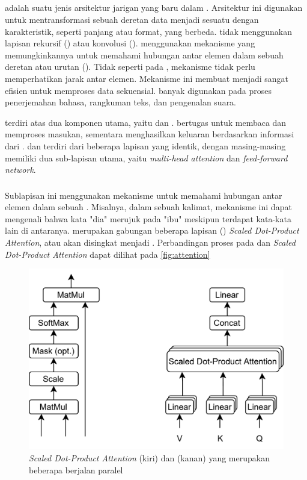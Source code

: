 \subsection{\transformer}
\label{subsec:transformer}

\transformer{} adalah suatu jenis arsitektur jarigan yang baru dalam \dl. Arsitektur ini digunakan untuk mentransformasi sebuah deretan data menjadi sesuatu dengan karakteristik, seperti panjang atau format, yang berbeda. \transformer{} tidak menggunakan lapisan rekursif (\rnn) atau konvolusi (\cnn). \transformer{} menggunakan mekanisme \selfattention{} yang memungkinkannya untuk memahami hubungan antar elemen dalam sebuah deretan atau urutan (\sequence). Tidak seperti pada \rnn{}, mekanisme \selfattention{} tidak perlu memperhatikan jarak antar elemen. Mekanisme ini membuat \transformer{} menjadi sangat efisien untuk memproses data sekuensial. \transformer{} banyak digunakan pada proses penerjemahan bahasa, rangkuman teks, dan pengenalan suara.

\transformer{} terdiri atas dua komponen utama, yaitu \encoder{} dan \decoder. \encoderfl{} bertugas untuk membaca dan memproses \sequence{} masukan, sementara \decoder{} menghasilkan \sequence{} keluaran berdasarkan informasi dari \encoder. \encoderfl{} dan \decoder{} terdiri dari beberapa lapisan yang identik, dengan masing-masing memiliki dua sub-lapisan utama, yaitu \emph{multi-head attention} dan \emph{feed-forward network}.

\subsubsection{\mha}
Sublapisan ini menggunakan mekanisme \selfattention{} untuk memahami hubungan antar elemen dalam sebuah \sequence{}. Misalnya, dalam sebuah kalimat, mekanisme ini dapat mengenali bahwa kata "dia" merujuk pada "ibu" meskipun terdapat kata-kata lain di antaranya. \mha{} merupakan gabungan beberapa lapisan (\layer) \emph{Scaled Dot-Product Attention}, atau akan disingkat menjadi \attention. Perbandingan proses pada \mha{} dan \emph{Scaled Dot-Product Attention} dapat dilihat pada \autoref{fig:attention}
	\begin{figure}[htbp]
		\centering
		\includegraphics[width=.8\textwidth]{images/attentionmha.png}
		\caption{\emph{Scaled Dot-Product Attention} (kiri) dan \mha{} (kanan) yang merupakan beberapa \layer{} \attention{} berjalan paralel \parencite{vaswani2017attention}}
		\label{fig:attention}
	\end{figure}

